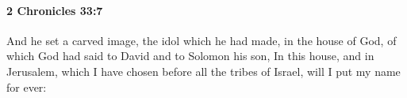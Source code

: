 
		\paragraph{2 Chronicles 33:7} %
			\label{2CHRONICLES-33-7}

			And he set a carved image, the idol which he had made, in the house of God, of which God had said to David and to Solomon his son, In this house, and in Jerusalem, which I have chosen before all the tribes of Israel, will I put my name for ever:


